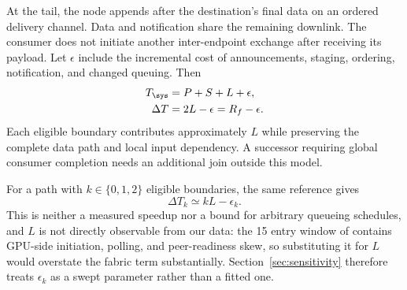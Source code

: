 At the tail, the node appends \done{} after the destination's final data on an ordered delivery channel. Data and notification share the remaining downlink. The consumer does not initiate another inter-endpoint exchange after receiving its payload. Let $\epsilon$ include the incremental cost of announcements, staging, ordering, notification, and changed queuing. Then
\begin{align}
 T_{\text{\sys}}&=P+S+L+\epsilon,\\
 \Delta T&=2L-\epsilon=R_f-\epsilon.
 \label{eq:gain}
\end{align}
Each eligible boundary contributes approximately $L$ while preserving the complete data path and local input dependency. A successor requiring global consumer completion needs an additional join outside this model.

For a path with $k\in\{0,1,2\}$ eligible boundaries, the same reference gives
\begin{equation}
 \Delta T_k\simeq kL-\epsilon_k.
 \label{eq:eligible}
\end{equation}
This is neither a measured speedup nor a bound for arbitrary queueing schedules, and
$L$ is not directly observable from our data: the 15\us{} entry window of
 contains GPU-side initiation, polling, and peer-readiness skew, so
substituting it for $L$ would overstate the fabric term substantially.
Section~\ref{sec:sensitivity} therefore treats $\epsilon_k$ as a swept parameter rather
than a fitted one.
